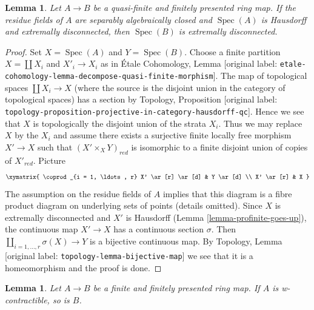 \documentclass[10pt,a4paper]{article}
\theoremstyle{plain}
\newtheorem{lemma}[subsection]{Lemma}
\theoremstyle{definition}
\theoremstyle{remark}
\numberwithin{equation}{subsection}
\def\Spec{\mathop{\mathrm{Spec}}}
\begin{document}
\begin{lemma}
\label{lemma-finite-finitely-presented-over-extremally-disconnected}
Let $A \to B$ be a quasi-finite and finitely presented ring map.
If the residue fields of $A$ are separably algebraically closed
and $\Spec(A)$ is Hausdorff and extremally disconnected, then $\Spec(B)$ is
extremally disconnected.
\end{lemma}

\begin{proof}
Set $X = \Spec(A)$ and $Y = \Spec(B)$. Choose a finite partition
$X = \coprod X_i$ and $X'_i \to X_i$ as in
\'Etale Cohomology, Lemma
\textnormal{[original label: \nolinkurl{etale-cohomology-lemma-decompose-quasi-finite-morphism}]}.
The map of topological spaces $\coprod X_i \to X$ (where the source
is the disjoint union in the category of topological spaces)
has a section by Topology, Proposition
\textnormal{[original label: \nolinkurl{topology-proposition-projective-in-category-hausdorff-qc}]}.
Hence we see that $X$ is topologically the disjoint union of the
strata $X_i$. Thus we may replace $X$ by the $X_i$ and assume there
exists a surjective finite locally free morphism $X' \to X$ such that
$(X' \times_X Y)_{red}$ is isomorphic to a finite disjoint union of
copies of $X'_{red}$. Picture
$$
\xymatrix{
\coprod_{i = 1, \ldots, r} X' \ar[r] \ar[d] & Y \ar[d] \\
X' \ar[r] & X
}
$$
The assumption on the residue fields of $A$ implies that
this diagram is a fibre product diagram on underlying sets
of points (details omitted).
Since $X$ is extremally disconnected and $X'$ is Hausdorff
(Lemma \ref{lemma-profinite-goes-up}), the continuous map
$X' \to X$ has a continuous section $\sigma$. Then
$\coprod_{i = 1, \ldots, r} \sigma(X) \to Y$ is a bijective
continuous map. By
Topology, Lemma \textnormal{[original label: \nolinkurl{topology-lemma-bijective-map}]}
we see that it is a homeomorphism and the proof is done.
\end{proof}

\begin{lemma}
\label{lemma-finite-finitely-presented-over-w-contractible}
Let $A \to B$ be a finite and finitely presented ring map.
If $A$ is w-contractible, so is $B$.
\end{lemma}
\end{document}
